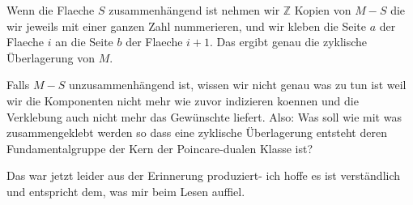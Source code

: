 Wenn die Flaeche $S$ zusammenhängend ist nehmen wir $\mathbb{Z}$ Kopien von $M-S$ die wir jeweils mit einer ganzen Zahl nummerieren, und wir kleben die Seite $a$ der Flaeche $i$ an die Seite $b$ der Flaeche $i+1$. Das ergibt genau die zyklische Überlagerung von $M$.

Falls $M-S$ unzusammenhängend ist, wissen wir nicht genau was zu tun ist weil wir die Komponenten nicht mehr wie zuvor indizieren koennen und die Verklebung auch nicht mehr das Gewünschte liefert. Also: Was soll wie mit was zusammengeklebt werden so dass eine zyklische Überlagerung entsteht deren Fundamentalgruppe der Kern der Poincare-dualen Klasse ist?

Das war jetzt leider aus der Erinnerung produziert- ich hoffe es ist verständlich und entspricht dem, was mir beim Lesen auffiel.

